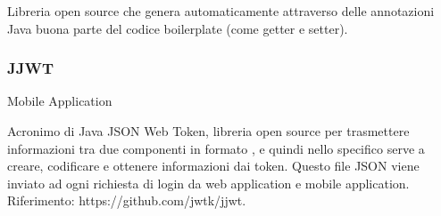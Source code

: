 \documentclass[../../../analisi-dei-requisiti.tex]{subfiles}
\begin{document}
Libreria open source che genera automaticamente attraverso delle annotazioni Java buona parte del codice boilerplate (come getter e setter).

\subsubsection{JJWT}%
\label{subs:jjwt}
Mobile Application

Acronimo di Java JSON Web Token, libreria open source per trasmettere informazioni tra due componenti in formato , e quindi nello specifico serve a creare, codificare e ottenere informazioni dai token. Questo file JSON viene inviato ad ogni richiesta di login da web application e mobile application.
Riferimento: https://github.com/jwtk/jjwt.
\end{document}
